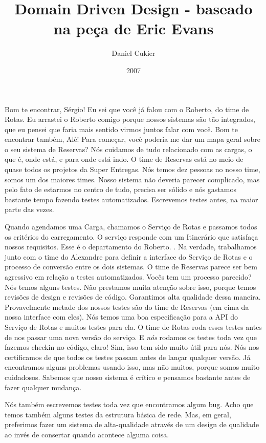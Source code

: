 \documentclass[12pt,play]{article}
\title{Domain Driven Design - baseado na peça de Eric Evans}
\author{Daniel Cukier}
\date{2007}
\begin{document}
\playstart


\act
\scene 
{}
\alex Bom te encontrar, Sérgio! Eu sei que você já falou com o Roberto, do time de Rotas. Eu arrastei o Roberto comigo porque nossos sistemas são tão integrados, que eu pensei que faria mais sentido virmos juntos falar com você.
\serg Bom te encontrar também, Alê! Para começar, você poderia me dar um mapa geral sobre o seu sistema de Reservas? 
\alex Nós cuidamos de tudo relacionado com as cargas, o que é, onde está, e para onde está indo. O time de Reservas está no meio de quase todos os projetos da Super Entregas. Nós temos dez pessoas no nosso time, somos um dos maiores times. Nosso sistema não deveria parecer complicado, mas pelo fato de estarmos no centro de tudo, precisa ser sólido e nós gastamos bastante tempo fazendo testes automatizados. Escrevemos testes antes, na maior parte das vezes.

Quando agendamos uma Carga, chamamos o Serviço de Rotas e passamos todos os critérios do carregamento. O serviço responde com um Itinerário que satisfaça nossos requisitos. Esse é o departamento do Roberto. .
\robe Na verdade, trabalhamos junto com o time do Alexandre para definir a interface do Serviço de Rotas e o processo de conversão entre os dois sistemas.
\serg O time de Reservas parece ser bem agressivo em relação a testes automatizados. Vocês tem um processo parecido?
\robe Nós temos alguns testes.  Não prestamos muita atenção sobre isso, porque temos revisões de design e revisões de código. Garantimos alta qualidade dessa maneira. Provavelmente metade dos nossos testes são do time de Reservas (em cima da nossa interface com eles).
\alex Nós temos uma boa especificação para a API do Serviço de Rotas e muitos testes para ela. O time de Rotas roda esses testes antes de nos passar uma nova versão do serviço. E \emph{nós} rodamos os testes toda vez que fazemos checkin no código, claro!
\robe Sim, isso tem sido muito útil para nós. Nós nos certificamos de que todos os testes passam antes de lançar qualquer versão. Já encontramos alguns problemas usando isso, mas não muitos, porque somos muito cuidadosos. Sabemos que nosso sistema é crítico e pensamos bastante antes de fazer qualquer mudança.

Nós também escrevemos testes toda vez que encontramos algum bug. Acho que temos também alguns testes da estrutura básica de rede. Mas, em geral, preferimos fazer um sistema de alta-qualidade através de um design de qualidade ao invés de consertar quando acontece alguma coisa.
\end{document}
